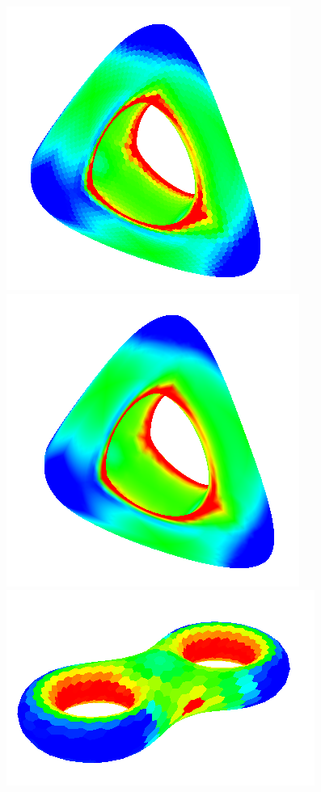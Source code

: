 \begin{figure}[H]
    \centering
    \centering
    \includegraphics[scale=0.9]{images/gc-genus.png}
    \endminipage\hfill
    \centering
    \includegraphics[scale=0.9]{images/gci-genus.png}
    \endminipage\hfill
    \centering
    \includegraphics[scale=0.9]{images/gc-eight.png}

\end{figure}
